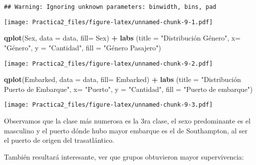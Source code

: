 \documentclass[]{article}
\newenvironment{Shaded}{\begin{snugshade}}{\end{snugshade}}
\newcommand{\KeywordTok}[1]{\textcolor[rgb]{0.13,0.29,0.53}{\textbf{#1}}}
\newcommand{\DataTypeTok}[1]{\textcolor[rgb]{0.13,0.29,0.53}{#1}}
\newcommand{\StringTok}[1]{\textcolor[rgb]{0.31,0.60,0.02}{#1}}
\newcommand{\OperatorTok}[1]{\textcolor[rgb]{0.81,0.36,0.00}{\textbf{#1}}}
\newcommand{\NormalTok}[1]{#1}
\begin{document}
\begin{verbatim}
## Warning: Ignoring unknown parameters: binwidth, bins, pad
\end{verbatim}

\texttt{[image: Practica2\_files/figure-latex/unnamed-chunk-9-1.pdf]}

\begin{Shaded}
\begin{Highlighting}[]
\KeywordTok{qplot}\NormalTok{(Sex, }\DataTypeTok{data =}\NormalTok{ data,  }\DataTypeTok{fill=}\NormalTok{ Sex) }\OperatorTok{+}
\StringTok{  }\KeywordTok{labs}\NormalTok{ (}\DataTypeTok{title =} \StringTok{"Distribución Género"}\NormalTok{, }\DataTypeTok{x=} \StringTok{"Género"}\NormalTok{, }\DataTypeTok{y =} \StringTok{"Cantidad"}\NormalTok{, }\DataTypeTok{fill =} \StringTok{"Género Pasajero"}\NormalTok{)}
\end{Highlighting}
\end{Shaded}

\texttt{[image: Practica2\_files/figure-latex/unnamed-chunk-9-2.pdf]}

\begin{Shaded}
\begin{Highlighting}[]
\KeywordTok{qplot}\NormalTok{(Embarked, }\DataTypeTok{data =}\NormalTok{ data,  }\DataTypeTok{fill=}\NormalTok{ Embarked) }\OperatorTok{+}\StringTok{ }
\StringTok{  }\KeywordTok{labs}\NormalTok{ (}\DataTypeTok{title =} \StringTok{"Distribución Puerto de Embarque"}\NormalTok{, }\DataTypeTok{x=} \StringTok{"Puerto"}\NormalTok{, }
        \DataTypeTok{y =} \StringTok{"Cantidad"}\NormalTok{, }\DataTypeTok{fill =} \StringTok{"Puerto de embarque"}\NormalTok{)}
\end{Highlighting}
\end{Shaded}

\texttt{[image: Practica2\_files/figure-latex/unnamed-chunk-9-3.pdf]}

Observamos que la clase más numerosa es la 3ra clase, el sexo
predominante es el masculino y el puerto dónde hubo mayor embarque es el
de Southampton, al ser el puerto de origen del trasatlántico.

También resultará interesante, ver que grupos obtuvieron mayor
supervivencia:
\end{document}
